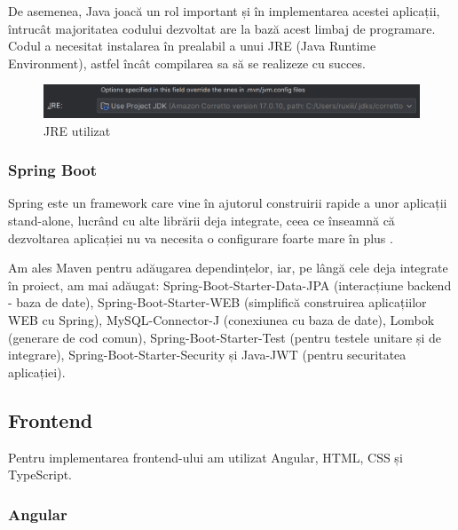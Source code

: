 De asemenea, Java joacă un rol important și în implementarea acestei aplicații, întrucât majoritatea codului dezvoltat are la bază acest limbaj de programare. Codul a necesitat instalarea în prealabil a unui JRE (Java Runtime Environment), astfel încât compilarea sa să se realizeze cu succes.

\begin{figure}[!htb]
    \centering
    \includegraphics[width=0.9\linewidth]{images/JRE.png}
    \caption{JRE utilizat}
    \label{fig:JRE}
\end{figure}

\vspace{0.5em}
    
\begin{minipage}{\textwidth}
\hfill
\begin{minipage}{0.9\textwidth}
\subsubsection{Spring Boot}
\end{minipage}
\end{minipage}

\hspace{0cm}Spring este un framework care vine în ajutorul construirii rapide a unor aplicații stand-alone, lucrând cu alte librării deja integrate, ceea ce înseamnă că dezvoltarea aplicației nu va necesita o  configurare foarte mare în plus \cite{citation4}.

Am ales Maven pentru adăugarea dependințelor, iar, pe lângă cele deja integrate în proiect, am mai adăugat: Spring-Boot-Starter-Data-JPA (interacțiune backend - baza de date), Spring-Boot-Starter-WEB (simplifică construirea aplicațiilor WEB cu Spring), MySQL-Connector-J (conexiunea cu baza de date), Lombok (generare de cod comun), Spring-Boot-Starter-Test (pentru testele unitare și de integrare), Spring-Boot-Starter-Security și Java-JWT (pentru securitatea aplicației).

\vspace{1.5em}
\subsection{Frontend}
Pentru implementarea frontend-ului am utilizat Angular, HTML, CSS și TypeScript.

\begin{minipage}{\textwidth}
\hfill
\begin{minipage}{0.9\textwidth}
\subsubsection{Angular}
\end{minipage}
\end{minipage}


